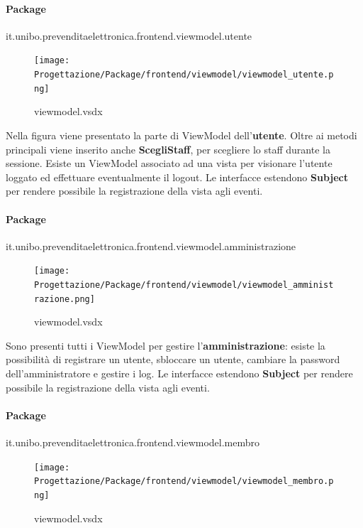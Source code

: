 \documentclass[a4paper]{article}
\begin{document}
\paragraph{Package} it.unibo.prevenditaelettronica.frontend.viewmodel.utente

\begin{figure}[H]
    \texttt{[image: Progettazione/Package/frontend/viewmodel/viewmodel\_utente.png]}
    \centering
    \caption{viewmodel.vsdx}
\end{figure}

Nella figura viene presentato la parte di ViewModel dell'\textbf{utente}. Oltre ai metodi principali viene inserito anche \textbf{ScegliStaff}, per scegliere lo staff durante la sessione. Esiste un ViewModel associato ad una vista per visionare l'utente loggato ed effettuare eventualmente il logout. Le interfacce estendono \textbf{Subject} per rendere possibile la registrazione della vista agli eventi.

\newpage

\paragraph{Package} it.unibo.prevenditaelettronica.frontend.viewmodel.amministrazione


\begin{figure}[H]
    \texttt{[image: Progettazione/Package/frontend/viewmodel/viewmodel\_amministrazione.png]}
    \centering
    \caption{viewmodel.vsdx}
\end{figure}

Sono presenti tutti i ViewModel per gestire l'\textbf{amministrazione}: esiste la possibilità di registrare un utente, sbloccare un utente, cambiare la password dell'amministratore e gestire i log. Le interfacce estendono \textbf{Subject} per rendere possibile la registrazione della vista agli eventi.

\paragraph{Package} it.unibo.prevenditaelettronica.frontend.viewmodel.membro

\begin{figure}[H]
    \texttt{[image: Progettazione/Package/frontend/viewmodel/viewmodel\_membro.png]}
    \centering
    \caption{viewmodel.vsdx}
\end{figure}
\end{document}
